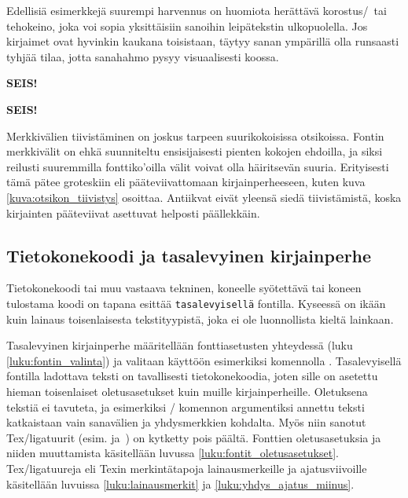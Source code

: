 Edellisiä esimerkkejä suurempi harvennus on huomiota herättävä
korostus\-/\ tai tehokeino, joka voi sopia yksittäisiin sanoihin
leipätekstin ulkopuolella. Jos kirjaimet ovat hyvinkin kaukana
toisistaan, täytyy sanan ympärillä olla runsaasti tyhjää tilaa, jotta
sanahahmo pysyy visuaalisesti koossa.

\begin{koodilohkosis}
  {\sffamily\bfseries{} SEIS!}
\end{koodilohkosis}

\begin{tulossis}
  {\sffamily\bfseries{} SEIS!}
\end{tulossis}

Merkkivälien tiivistäminen on joskus tarpeen suurikokoisissa otsikoissa.
Fontin merkkivälit on ehkä suunniteltu ensisijaisesti pienten kokojen
ehdoilla, ja siksi reilusti suuremmilla fonttiko'oilla välit voivat olla
häiritsevän suuria. Erityisesti tämä pätee groteskiin eli
pääteviivattomaan kirjainperheeseen, kuten kuva
\ref{kuva:otsikon_tiivistys} osoittaa. Antiikvat eivät yleensä siedä
tiivistämistä, koska kirjainten pääteviivat asettuvat helposti
päällekkäin.


\subsection{Tietokonekoodi ja tasalevyinen kirjainperhe}

Tietokonekoodi tai muu vastaava tekninen, koneelle syötettävä tai koneen
tulostama koodi on tapana esittää \texttt{tasalevyisellä} fontilla.
Kyseessä on ikään kuin lainaus toisenlaisesta tekstityypistä, joka ei
ole luonnollista kieltä lainkaan.

Tasalevyinen kirjainperhe määritellään fonttiasetusten yhteydessä (luku
\ref{luku:fontin_valinta}) ja valitaan käyttöön esimerkiksi komennolla
. Tasalevyisellä fontilla ladottava teksti on
tavallisesti tietokonekoodia, joten sille on asetettu hieman
toisenlaiset oletusasetukset kuin muille kirjainperheille. Oletuksena
tekstiä ei tavuteta, ja esimerkiksi \-/ komennon
argumentiksi annettu teksti katkaistaan vain sanavälien ja yhdysmerkkien
kohdalta. Myös niin sanotut Tex\-/ligatuurit (esim. 
ja~\koodi{--}) on kytketty pois päältä. Fonttien oletusasetuksia ja
niiden muuttamista käsitellään luvussa
\ref{luku:fontit_oletusasetukset}. Tex\-/ligatuureja eli Texin
merkintätapoja lainausmerkeille ja ajatusviivoille käsitellään luvuissa
\ref{luku:lainausmerkit} ja \ref{luku:yhdys_ajatus_miinus}.


